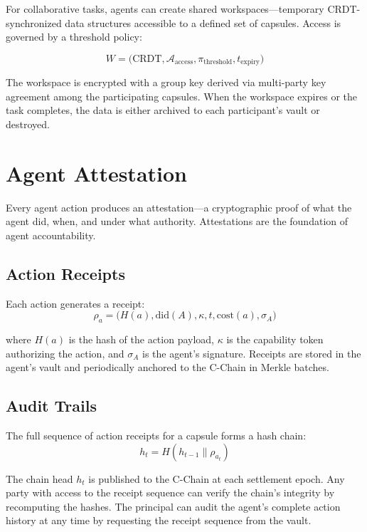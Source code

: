 \documentclass[11pt,a4paper]{article}
\begin{document}
For collaborative tasks, agents can create shared workspaces---temporary CRDT-synchronized data structures accessible to a defined set of capsules. Access is governed by a threshold policy:

\begin{equation}\label{eq:workspace}
    W = \big(\text{CRDT}, \mathcal{A}_{\text{access}}, \pi_{\text{threshold}}, t_{\text{expiry}}\big)
\end{equation}

The workspace is encrypted with a group key derived via multi-party key agreement among the participating capsules. When the workspace expires or the task completes, the data is either archived to each participant's vault or destroyed.

\section{Agent Attestation}\label{sec:attestation}

Every agent action produces an attestation---a cryptographic proof of what the agent did, when, and under what authority. Attestations are the foundation of agent accountability.

\subsection{Action Receipts}

Each action generates a receipt:
\begin{equation}\label{eq:action-receipt}
    \rho_a = \big(H(a), \text{did}(A), \kappa, t, \text{cost}(a), \sigma_A\big)
\end{equation}

where $H(a)$ is the hash of the action payload, $\kappa$ is the capability token authorizing the action, and $\sigma_A$ is the agent's signature. Receipts are stored in the agent's vault and periodically anchored to the C-Chain in Merkle batches.

\subsection{Audit Trails}

The full sequence of action receipts for a capsule forms a hash chain:
\begin{equation}\label{eq:audit-chain}
    h_t = H(h_{t-1} \| \rho_{a_t})
\end{equation}

The chain head $h_t$ is published to the C-Chain at each settlement epoch. Any party with access to the receipt sequence can verify the chain's integrity by recomputing the hashes. The principal can audit the agent's complete action history at any time by requesting the receipt sequence from the vault.
\end{document}
